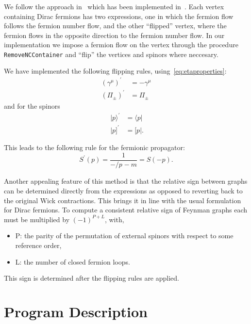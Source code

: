 \documentclass[preprint,number,12pt,sort&compress]{elsarticle}
\newcommand{\fmslash}[1]{\ensuremath{/\!\!\!{#1}}}
\newcommand{\pslash}[1][{}]{\fmslash{p}_{#1}}
\newcommand{\bra}[1]{\langle #1 \vert}
\newcommand{\brb}[1]{[ #1 \vert}
\newcommand{\kea}[1]{\vert #1 \rangle}
\newcommand{\keb}[1]{\vert #1 ]}
\begin{document}
We follow the approach in~\cite{Denner:1992vza}
which has been implemented in~\cite{Hahn:2000kx}. 
Each vertex containing Dirac fermions has two expressions,
one in which the fermion flow follows the fermion
number flow, and the other ``flipped'' vertex,
where the fermion flows in the
opposite direction to the fermion number flow.
In our implementation we impose a fermion flow on the vertex 
through the procedure \verb|RemoveNCContainer| and
``flip'' the vertices and spinors where neccesary.

We have implemented the following flipping rules, using~\eqref{eq:etaproperties}:
\begin{equation}\label{eq:fliprules}
\begin{array}{cc}
(\gamma^{\mu})^{'} &= -\gamma^{\mu}  \\
(\Pi_{\pm})^{'} &= \Pi_{\pm}
\end{array}
\end{equation}
and for the spinors 
\begin{equation}~\label{eq:spinorCtransform}
\begin{array}{cc}
\kea{p}^{'} &= \bra{p} \\
\keb{p}^{'} &= \brb{p}.
\end{array}
\end{equation}


This leads to the following rule for the
fermionic propagator:
\begin{equation}
S^{'}(p) = \frac{1}{-\pslash - m} = S(-p).
\end{equation} 

Another appealing feature of this method is that
the relative sign between graphs can be determined directly from the expressions
as opposed to reverting back to the original Wick contractions.
This brings it in line with the usual formulation for Dirac fermions.
To compute a consistent relative sign of Feynman graphs each must be multiplied by
$(-1)^{P+L}$, with, 
\begin{itemize}\label{RSIFlist}
 \item{P: the parity of the permutation of external spinors with respect to some reference order,}
\item{L: the number of closed fermion loops}.
\end{itemize}
This sign is determined after the flipping rules are applied.

\section{Program Description}\label{sec:interface}
\end{document}
